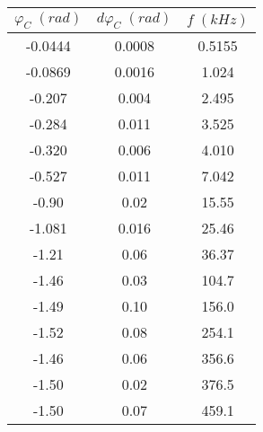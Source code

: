 \begin{tabular}{cc|c}
\toprule
$\varphi_{C} \; (rad)$ & $d\varphi_{C} \; (rad)$ & $f \; (kHz)$ \\
\midrule
                -0.0444 &                  0.0008 &       0.5155 \\
                -0.0869 &                  0.0016 &        1.024 \\
                 -0.207 &                   0.004 &        2.495 \\
                 -0.284 &                   0.011 &        3.525 \\
                 -0.320 &                   0.006 &        4.010 \\
                 -0.527 &                   0.011 &        7.042 \\
                  -0.90 &                    0.02 &        15.55 \\
                 -1.081 &                   0.016 &        25.46 \\
                  -1.21 &                    0.06 &        36.37 \\
                  -1.46 &                    0.03 &        104.7 \\
                  -1.49 &                    0.10 &        156.0 \\
                  -1.52 &                    0.08 &        254.1 \\
                  -1.46 &                    0.06 &        356.6 \\
                  -1.50 &                    0.02 &        376.5 \\
                  -1.50 &                    0.07 &        459.1 \\
\bottomrule
\end{tabular}
